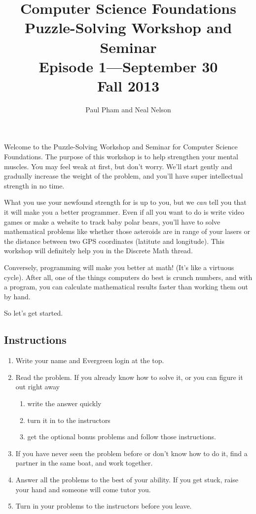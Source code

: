 \documentclass{article}
\title{Computer Science Foundations\\ Puzzle-Solving Workshop and Seminar\\
\large{Episode 1---September 30}\\
Fall 2013}
\author{Paul Pham and Neal Nelson}
\begin{document}
\maketitle

Welcome to the Puzzle-Solving Workshop and Seminar for
Computer Science Foundations. The purpose of this workshop
is to help strengthen your mental muscles. You may feel weak at
first, but don't worry. We'll start gently and gradually increase
the weight of the problem, and you'll have super intellectual
strength in no time.

What you use your newfound strength for is up to you, but we
\emph{can} tell you that it will make you a better programmer. Even if
all you want to do is write video games or make a website to track
baby polar bears, you'll have to solve mathematical problems
like whether those asteroids are in range of your lasers or the
distance between two GPS coordinates (latitute and longitude).
This workshop will definitely help you in the Discrete Math thread.

Conversely,
programming will make you better at math! (It's like a virtuous
cycle). After all,
one of the things computers do best is crunch numbers, and with
a program, you can calculate mathematical results faster than
working them out by hand.

So let's get started.

\subsection{Instructions}

\begin{enumerate}
\item Write your name and Evergreen login at the top.
\item Read the problem. If you already know how to solve it, or you
can figure it out right away
\begin{enumerate}
\item write the answer quickly
\item turn it in to the instructors
\item get the optional bonus problems and follow those instructions.
\end{enumerate}
\item If you have never seen the problem before or don't know how to do it,
find a partner in the same boat, and work together.
\item Answer all the problems to the best of your ability.
If you get stuck, raise your hand and someone will come tutor you.
\item Turn in your problems to the instructors before you leave.
\end{enumerate}
\end{document}
